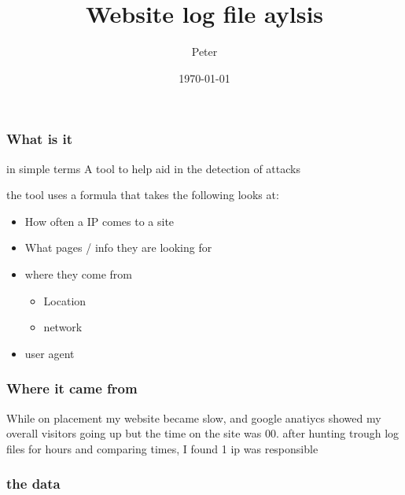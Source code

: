 \documentclass{beamer}
\title{Website log file aylsis}
\author{Peter}
\date{\today}
\begin{document}
\begin{frame}
	\maketitle
\end{frame}


\begin{frame}
	\frametitle{What is it}
	\begin{block}{in simple terms}
	A tool to help aid in the detection of attacks
	\end{block}
	the tool uses a formula that takes the following looks at:
	\begin{itemize}
	\item How often a IP comes to a site
	\item What pages / info they are looking for
	\item where they come from
		\begin{itemize}
		\item Location 
		\item network
		\end{itemize}
	\item user agent
	\end{itemize}
\end{frame}

\begin{frame}
	\frametitle{Where it came from}
	 While on placement my website became slow, and google anatiycs showed my overall visitors going up but the time on the site was 00.
	 after hunting trough log files for hours and comparing times, I found 1 ip was responsible
\end{frame}

\begin{frame}
	\frametitle{the data}
\end{frame}
\end{document}
